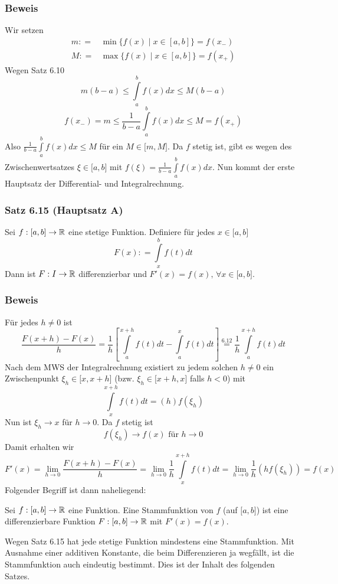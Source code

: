\subsubsection*{Beweis}
Wir setzen
\begin{align*}
m: =&\min \{ f(x)\mid x \in [a,b]\}  = f({x_ - })\\
M: =&\max \{ f(x)\mid x \in [a,b]\}  = f({x_ + })
\end{align*}
Wegen Satz 6.10
\[m(b - a) \le \int\limits_a^b {f(x)dx \le M(b - a)} \]
\[f({x_ - }) = m \le \frac{1}{{b - a}}\int\limits_a^b {f(x)dx \le M = f({x_ + })} \]
Also $\frac{1}{{b - a}}\int\limits_a^b {f(x)dx \le M} $ für ein $M\in\lbrack m,M\rbrack$. Da $f$ stetig ist, gibt es wegen des Zwischenwertsatzes $\xi\in\lbrack a,b\rbrack$ mit $f(\xi ) = \frac{1}{{b - a}}\int\limits_a^b {f(x)dx} $. Nun kommt der erste Hauptsatz der Differential- und Integralrechnung.\\

\subsubsection*{Satz 6.15 (Hauptsatz A)}
Sei $f:\lbrack a,b\rbrack\to\mathbb{R}$ eine stetige Funktion. Definiere für jedes $x\in\lbrack a,b\rbrack$ \[F(x): = \int\limits_x^b {f(t)dt} \]
Dann ist $F:I\to\mathbb{R}$ differenzierbar und $F'(x)=f(x)\text{, }\forall x \in\lbrack a,b\rbrack$.\\
\subsubsection*{Beweis}
Für jedes $h\neq 0$ ist \[\frac{{F(x + h) - F(x)}}{h} = \frac{1}{h}\left[ {\int\limits_a^{x + h} {f(t)dt}  - \int\limits_a^x {f(t)dt} } \right] \mathop  = \limits^{6.12}  \frac{1}{h}\int\limits_a^{x + h} {f(t)dt} \]
Nach dem MWS der Integralrechnung existiert zu jedem solchen $h\neq 0$ ein Zwischenpunkt $\xi_h\in\lbrack x,x+h\rbrack$ (bzw. $\xi_h\in\lbrack x + h,x\rbrack$ falls $h<0$) mit \[\int\limits_x^{x + h} {f(t)dt = (h)f({\xi _h})} \]
Nun ist $\xi_h \to x$ für $h\to 0$. Da $f$ stetig ist \[f(\xi_h)\to f(x) \text{ für } h\to 0\]
Damit erhalten wir \[F'(x) = \mathop {\lim }\limits_{h \to 0} \frac{{F(x + h) - F(x)}}{h} = \mathop {\lim }\limits_{h \to 0} \frac{1}{h}\int\limits_x^{x + h} {f(t)dt = } \mathop {\lim }\limits_{h \to 0} \frac{1}{h}(hf({\xi _h})) = f(x)\]
Folgender Begriff ist dann naheliegend: \\

\begin{definition}{6.16}
 Sei $f:\lbrack a,b\rbrack\to\mathbb{R}$ eine Funktion. Eine Stammfunktion von $f$ (auf $\lbrack a,b\rbrack$) ist eine differenzierbare Funktion $F:\lbrack a,b\rbrack\to\mathbb{R}$ mit $F'(x)=f(x)$.\\
\end{definition}
\noindent Wegen Satz 6.15 hat jede stetige Funktion mindestens eine Stammfunktion. Mit Ausnahme einer additiven Konstante, die beim Differenzieren ja wegfällt, ist die Stammfunktion auch eindeutig bestimmt. Dies ist der Inhalt des folgenden Satzes.\\


